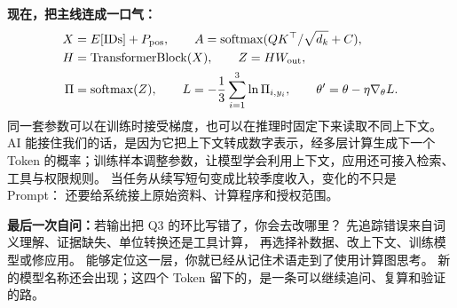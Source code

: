 \textbf{现在，把主线连成一口气：}
\[
\begin{aligned}
X&=E[\mathrm{IDs}]+P_{\rm pos},\qquad
A=\operatorname{softmax}(QK^\top/\sqrt{d_k}+C),\\
H&=\operatorname{TransformerBlock}(X),\qquad Z=HW_{\rm out},\\
\Pi&=\operatorname{softmax}(Z),\qquad L=-\frac13\sum_{i=1}^{3}\ln\Pi_{i,y_i},\qquad
\theta'=\theta-\eta\nabla_\theta L.
\end{aligned}
\]
同一套参数可以在训练时接受梯度，也可以在推理时固定下来读取不同上下文。
AI 能接住我们的话，是因为它把上下文转成数字表示，经多层计算生成下一个 Token 的概率；训练样本调整参数，让模型学会利用上下文，应用还可接入检索、工具与权限规则。
当任务从续写短句变成比较季度收入，变化的不只是 Prompt：
还要给系统接上原始资料、计算程序和授权范围。

\textbf{最后一次自问：}若输出把 Q3 的环比写错了，你会去改哪里？
先追踪错误来自词义理解、证据缺失、单位转换还是工具计算，
再选择补数据、改上下文、训练模型或修应用。
能够定位这一层，你就已经从记住术语走到了使用计算图思考。
新的模型名称还会出现；这四个 Token 留下的，是一条可以继续追问、复算和验证的路。
